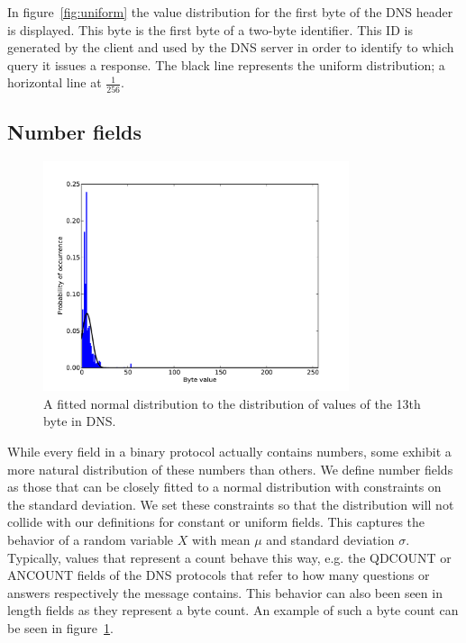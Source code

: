 \documentclass[a4paper]{report}
\begin{document}
In figure~\ref{fig:uniform} the value distribution for the first byte of the
DNS header is displayed. This byte is the first byte of a two-byte identifier.
This ID is generated by the client and used by the DNS server in order to
identify to which query it issues a response. The black line represents the
uniform distribution; a horizontal line at $\frac{1}{256}$.

\newpage

\subsection{Number fields}

\begin{figure}[h]
    \centering
    \includegraphics[width=0.8\textwidth]{img/number}
    \captionsetup{width=0.8\textwidth}
    \caption{A fitted normal distribution to the distribution of values of the
    13th byte in DNS.}
    \label{fig:number}
\end{figure}

While every field in a binary protocol actually contains numbers, some exhibit
a more natural distribution of these numbers than others. We define number
fields as those that can be closely fitted to a normal distribution with
constraints on the standard deviation. We set these constraints so that the
distribution will not collide with our definitions for constant or uniform
fields. This captures the behavior of a random variable $X$ with mean $\mu$ and
standard deviation $\sigma$. Typically, values that represent a count behave
this way, e.g. the QDCOUNT or ANCOUNT fields of the DNS protocols that refer to
how many questions or answers respectively the message contains. This behavior
can also been seen in length fields as they represent a byte count. An example
of such a byte count can be seen in figure~\ref{fig:number}.
\end{document}
